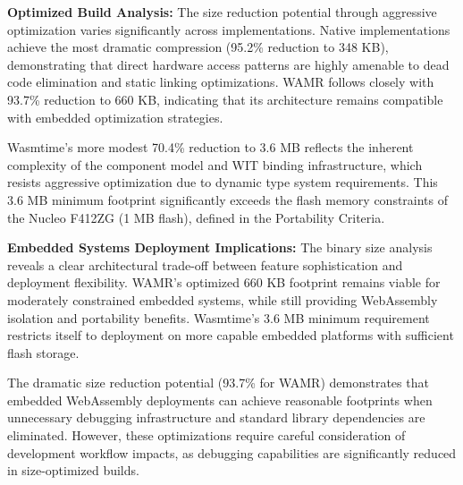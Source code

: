\textbf{Optimized Build Analysis:} The size reduction potential through aggressive optimization varies significantly across implementations. Native implementations achieve the most dramatic compression (95.2\% reduction to 348 KB), demonstrating that direct hardware access patterns are highly amenable to dead code elimination and static linking optimizations. WAMR follows closely with 93.7\% reduction to 660 KB, indicating that its architecture remains compatible with embedded optimization strategies.

Wasmtime's more modest 70.4\% reduction to 3.6 MB reflects the inherent complexity of the component model and WIT binding infrastructure, which resists aggressive optimization due to dynamic type system requirements. This 3.6 MB minimum footprint significantly exceeds the flash memory constraints of the Nucleo F412ZG (1 MB flash), defined in the Portability Criteria.

\textbf{Embedded Systems Deployment Implications:} The binary size analysis reveals a clear architectural trade-off between feature sophistication and deployment flexibility. WAMR's optimized 660 KB footprint remains viable for moderately constrained embedded systems, while still providing WebAssembly isolation and portability benefits. Wasmtime's 3.6 MB minimum requirement restricts itself to deployment on more capable embedded platforms with sufficient flash storage.

The dramatic size reduction potential (93.7\% for WAMR) demonstrates that embedded WebAssembly deployments can achieve reasonable footprints when unnecessary debugging infrastructure and standard library dependencies are eliminated. However, these optimizations require careful consideration of development workflow impacts, as debugging capabilities are significantly reduced in size-optimized builds.